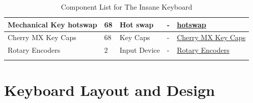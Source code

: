 \documentclass[a4paper,11pt]{article}%
\begin{document}
\begin{longtable}{|p{3cm}|p{2cm}|p{4cm}|p{2cm}|p{5cm}|}
    \hline
    Mechanical Key hotswap & 68 &Hot swap  & - & \href{https://www.amazon.com/dp/B0CZ79GGDF?ref=ppx_yo2ov_dt_b_fed_asin_title}{hotswap} \\
    \hline
    Cherry MX Key Caps & 68 &Key Caps & - & \href{https://www.aliexpress.com/item/3256801599125271.html?spm=a2g0o.order_list.order_list_main.5.43b918023cg2lz}{Cherry MX Key Caps} \\
    \hline
    Rotary Encoders & 2 &Input Device & - & \href{https://www.adafruit.com/product/377}{Rotary Encoders} \\
    \hline
    \caption{Component List for The Insane Keyboard}
    \label{tab:components}
    \end{longtable}
    
\section{Keyboard Layout and Design}
\end{document}
